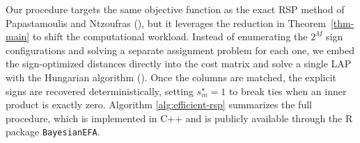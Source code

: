 \documentclass[
  man,
  longtable,
  nolmodern,
  notxfonts,
  notimes,
  colorlinks=true,linkcolor=blue,citecolor=blue,urlcolor=blue]{apa7}
\theoremstyle{plain}
\theoremstyle{plain}
\theoremstyle{remark}
\begin{document}
Our procedure targets the same objective function as the exact RSP
method of Papastamoulis and Ntzoufras
(), but it
leverages the reduction in Theorem~\ref{thm-main} to shift the
computational workload. Instead of enumerating the \(2^M\) sign
configurations and solving a separate assignment problem for each one,
we embed the sign-optimized distances directly into the cost matrix and
solve a single LAP with the Hungarian algorithm
(). Once the columns are
matched, the explicit signs are recovered deterministically, setting
\(s^\star_m=1\) to break ties when an inner product is exactly zero.
Algorithm \ref{alg:efficient-rsp} summarizes the full procedure, which
is implemented in C++ and is publicly available through the R package
\texttt{BayesianEFA}.
\end{document}
